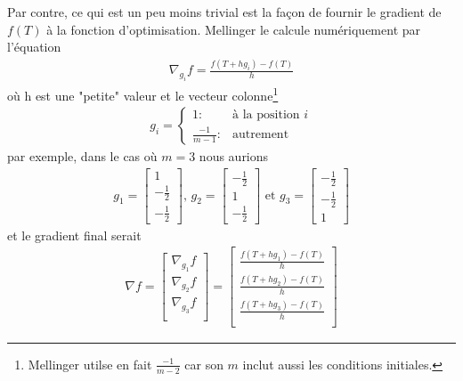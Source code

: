 Par contre, ce qui est un peu moins trivial est la façon de fournir le gradient de $f(T)$ à la fonction d'optimisation. Mellinger le calcule numériquement par l'équation
\begin{align}
	\nabla_{g_i}f = \frac{f(T + hg_i) - f(T)}{h}
\end{align}
où h est une "petite" valeur et le vecteur colonne\footnote{Mellinger utilse en fait $\frac{-1}{m-2}$ car son $m$ inclut aussi les conditions initiales.} 
\begin{align}
g_i = \left\{
  \begin{array}{ll}
    1: & \text{à la position }i  \\
    \frac{-1}{m-1} : & \text{autrement}
  \end{array}
\right.
\end{align}
par exemple, dans le cas où $m=3$ nous aurions
\begin{align*}
	g_1 = \begin{bmatrix} 1\\ -\frac{1}{2} \\-\frac{1}{2} 	\end{bmatrix}\text{, }
	g_2 = \begin{bmatrix} -\frac{1}{2}\\ 1 \\-\frac{1}{2} 	\end{bmatrix}\text{ et }
	g_3 = \begin{bmatrix} -\frac{1}{2} \\-\frac{1}{2}\\ 1 	\end{bmatrix}
\end{align*}
et le gradient final serait
\begin{align*}
\nabla f = \begin{bmatrix}
	\nabla_{g_1}f\\
	\nabla_{g_2}f\\
	\nabla_{g_3}f\\
\end{bmatrix} = \begin{bmatrix}
	 \frac{f(T + hg_1) - f(T)}{h}\\
	 \frac{f(T + hg_2) - f(T)}{h}\\
	 \frac{f(T + hg_3) - f(T)}{h}\\
\end{bmatrix}
\end{align*}













